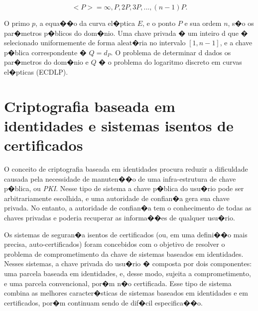 \documentclass[a4paper,capchap,espacoduplo,normaltoc]{abntepusp}
\begin{document}
\begin{equation}
\label{eq:defcurvaeliptica3}
<P> = { \infty, P, 2P, 3P, ..., (n-1)P }.
\end{equation}

O primo $p$, a equa��o da curva el�ptica $E$, e o ponto $P$ e sua ordem $n$, s�o os par�metros p�blicos do dom�nio. Uma chave privada � um inteiro d que � selecionado uniformemente de forma aleat�ria no intervalo $[1,n-1]$, e a chave p�blica correspondente � $Q = d_{P}$.
O problema de determinar d dados os par�metros do dom�nio e $Q$ � o problema do logaritmo discreto em curvas el�pticas (ECDLP).

\section{Criptografia baseada em identidades e sistemas isentos de certificados}
O conceito de criptografia baseada em identidades \cite{shamir} procura reduzir a dificuldade causada pela necessidade de manuten��o de uma infra-estrutura de chave p�blica, ou \emph{PKI}. Nesse tipo de sistema a chave p�blica do usu�rio pode ser arbitrariamente escolhida, e uma autoridade de confian�a gera sua chave privada. No entanto, a autoridade de confian�a tem o conhecimento de todas as chaves privadas e poderia recuperar as informa��es de qualquer usu�rio.

Os sistemas de seguran�a isentos de certificados (ou, em uma defini��o mais precisa, auto-certificados) \cite{al-riyami-paterson} foram concebidos com o objetivo de resolver o problema de comprometimento da chave de sistemas baseados em identidades. Nesses sistemas, a chave privada do usu�rio � composta por dois componentes: uma parcela baseada em identidades, e, desse modo, sujeita a comprometimento, e uma parcela convencional, por�m n�o certificada. Esse tipo de sistema combina as melhores caracter�sticas de sistemas baseados em identidades e em certificados, por�m continuam sendo de dif�cil especifica��o.
\end{document}
